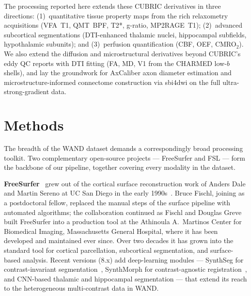 \documentclass[11pt,a4paper]{article}\usepackage[]{graphicx}\usepackage[]{xcolor}
\begin{document}
\noindent The processing reported here extends these CUBRIC derivatives
in three directions: (1)~quantitative tissue property maps from the
rich relaxometry acquisitions (VFA~T1, QMT~BPF, T2*, g-ratio,
MP2RAGE~T1); (2)~advanced subcortical segmentations (DTI-enhanced
thalamic nuclei, hippocampal subfields, hypothalamic subunits);
and (3)~perfusion quantification (CBF, OEF, CMRO$_2$). We also
extend the diffusion and microstructural derivatives beyond CUBRIC's
eddy QC reports with DTI fitting (FA, MD, V1 from the CHARMED
low-$b$ shells), and lay the groundwork for AxCaliber axon diameter
estimation and microstructure-informed connectome construction via
sbi4dwi on the full ultra-strong-gradient data.

\section{Methods}

The breadth of the WAND dataset demands a correspondingly broad
processing toolkit. Two complementary open-source projects ---
FreeSurfer and FSL --- form the backbone of our pipeline, together
covering every modality in the dataset.

\textbf{FreeSurfer}~\citep{Fischl2012freesurfer} grew out of the
cortical surface reconstruction work of Anders Dale and Martin Sereno
at UC San Diego in the early
1990s~\citep{Dale1999cortical,Fischl1999cortical}. Bruce Fischl,
joining as a postdoctoral fellow, replaced the manual steps of the
surface pipeline with automated algorithms; the collaboration
continued as Fischl and Douglas Greve built FreeSurfer into a
production tool at the Athinoula A.\ Martinos Center for Biomedical
Imaging, Massachusetts General Hospital, where it has been developed
and maintained ever since. Over two decades it has grown into the
standard tool for cortical parcellation, subcortical segmentation,
and surface-based analysis. Recent versions (8.x) add
deep-learning modules --- SynthSeg for contrast-invariant
segmentation~\citep{Billot2023synthseg}, SynthMorph for
contrast-agnostic registration~\citep{Hoffmann2022synthmorph}, and
CNN-based thalamic and hippocampal segmentation --- that extend its
reach to the heterogeneous multi-contrast data in WAND.
\end{document}
